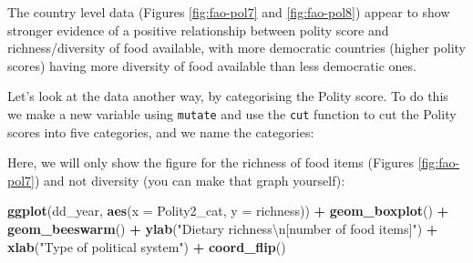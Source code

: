 \documentclass[]{book}
\newenvironment{Shaded}{\begin{snugshade}}{\end{snugshade}}
\newcommand{\CharTok}[1]{\textcolor[rgb]{0.31,0.60,0.02}{#1}}
\newcommand{\DataTypeTok}[1]{\textcolor[rgb]{0.13,0.29,0.53}{#1}}
\newcommand{\DecValTok}[1]{\textcolor[rgb]{0.00,0.00,0.81}{#1}}
\newcommand{\KeywordTok}[1]{\textcolor[rgb]{0.13,0.29,0.53}{\textbf{#1}}}
\newcommand{\NormalTok}[1]{#1}
\newcommand{\OperatorTok}[1]{\textcolor[rgb]{0.81,0.36,0.00}{\textbf{#1}}}
\newcommand{\StringTok}[1]{\textcolor[rgb]{0.31,0.60,0.02}{#1}}
\begin{document}
The country level data (Figures \ref{fig:fao-pol7} and \ref{fig:fao-pol8}) appear to show stronger evidence of a positive relationship between polity score and richness/diversity of food available, with more democratic countries (higher polity scores) having more diversity of food available than less democratic ones.

Let's look at the data another way, by categorising the Polity score. To do this we make a new variable using \texttt{mutate} and use the \texttt{cut} function to cut the Polity scores into five categories, and we name the categories:

\begin{Shaded}
\end{Shaded}

Here, we will only show the figure for the richness of food items (Figures \ref{fig:fao-pol7}) and not diversity (you can make that graph yourself):

\begin{Shaded}
\begin{Highlighting}[]
\KeywordTok{ggplot}\NormalTok{(dd_year, }\KeywordTok{aes}\NormalTok{(}\DataTypeTok{x =}\NormalTok{ Polity2_cat, }\DataTypeTok{y =}\NormalTok{ richness)) }\OperatorTok{+}
\StringTok{  }\KeywordTok{geom_boxplot}\NormalTok{() }\OperatorTok{+}\StringTok{ }\KeywordTok{geom_beeswarm}\NormalTok{() }\OperatorTok{+}
\StringTok{  }\KeywordTok{ylab}\NormalTok{(}\StringTok{"Dietary richness}\CharTok{\textbackslash{}n}\StringTok{[number of food items]"}\NormalTok{) }\OperatorTok{+}
\StringTok{  }\KeywordTok{xlab}\NormalTok{(}\StringTok{"Type of political system"}\NormalTok{) }\OperatorTok{+}
\StringTok{  }\KeywordTok{coord_flip}\NormalTok{()}
\end{Highlighting}
\end{Shaded}
\end{document}
